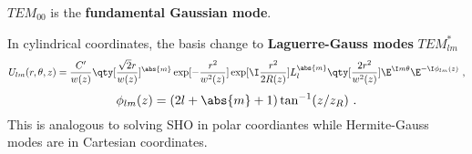 $TEM_{00}$ is the \textbf{fundamental Gaussian mode}.

In cylindrical coordinates, the basis change to \textbf{Laguerre-Gauss modes} $TEM_{lm}^*$
\begin{equation}
U_{lm}(r, \theta, z) = \frac{C'}{w(z)} \qty[\frac{\sqrt{2}r}{w(z)}]^{\abs{m}} \exp[-\frac{r^2}{w^2(z)}] \exp[\I \frac{r^2}{2R(z)}] L_l^{\abs{m}} \qty[\frac{2r^2}{w^2(z)}] \E^{\I m\theta} \E^{-\I \phi_{lm}(z)}~,
\end{equation}
\begin{equation}
\phi_{lm}(z) = (2l + \abs{m} + 1) \tan^{-1} (z/z_R)~.
\end{equation}
This is analogous to solving SHO in polar coordiantes while Hermite-Gauss modes are in Cartesian coordinates. 
